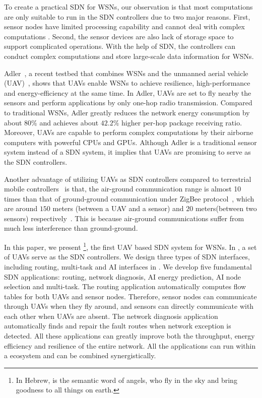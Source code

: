 To create a practical SDN for WSNs, 
our observation is that most computations are only suitable to run
in the SDN controllers due to two major reasons. 
First, sensor nodes 
have limited processing capability and cannot 
deal with complex computations \cite{Sharma2012Security,Heller2012The}.
Second, the sensor devices are also lack of storage space 
to support complicated operations. With the help of SDN, 
the controllers can conduct complex computations 
and store large-scale data information for WSNs.

Adler~\cite{Alder}, a recent testbed that combines WSNs
and the unmanned aerial vehicle 
(UAV)~\cite{Cambone2005Unmanned, Perry2000Unmanned, Cathcart2014Method},
shows that UAVs enable WSNs to achieve resilience, 
high-performance and energy-efficiency at the same time.
In Adler, UAVs are set to fly nearby the sensors and perform applications by only one-hop 
radio transmission.
Compared to traditional WSNs, Adler greatly reduces the network energy consumption by about $80\%$
and achieves about $42.2\%$ higher per-hop package receiving ratio.
Moreover, UAVs are capable to perform complex computations 
by their airborne computers with powerful CPUs and GPUs.
Although Adler is a traditional sensor system instead of a SDN system, 
it implies that UAVs are promising to serve as the SDN controllers.

Another advantage of utilizing UAVs as SDN controllers compared to
terrestrial mobile controllers~\cite{Somasundara2007Mobile} is that, 
the air-ground communication range
is almost 10 times than that of ground-ground communication 
under ZigBee protocol~\cite{Farahani2008ZigBee}, which are
around $150$ meters (between a UAV and a sensor) and $20$ meters(between two sensors) respectively~\cite{Alder}.
This is because air-ground communications suffer from much less interference than ground-ground.

In this paper, we present {\sdn}\footnote{In Hebrew, {\sdn} is the semantic word of angels, who fly in the sky and bring goodness to all things on earth. }, 
the first UAV based SDN system for WSNs.
In {\sdn}, a set of UAVs serve as the SDN controllers.
We design three types of SDN interfaces, including routing, multi-task and AI interfaces in {\sdn}. 
We develop five fundamental SDN applications: routing, network diagnosis, 
AI energy prediction, AI node selection and multi-task.
The routing application automatically computes flow tables for both UAVs and sensor nodes.
Therefore, sensor nodes can communicate through UAVs when they fly around,
and sensors can directly communicate with each other when UAVs are absent.
The network diagnosis application automatically finds and repair the fault routes when network exception is detected.
All these applications can greatly improve both the throughput, energy efficiency and resilience of the entire network. 
All the applications can run within a ecosystem
and can be combined synergistically. 


